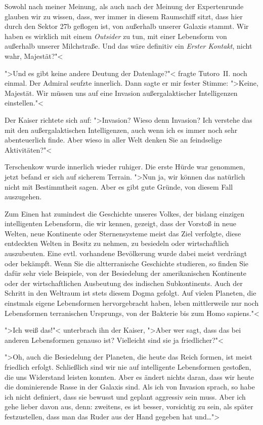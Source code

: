 Sowohl nach meiner Meinung, als auch nach der Meinung der Expertenrunde glauben wir zu wissen, dass, wer immer in diesem Raumschiff sitzt, dass hier durch den Sektor \textsf{27b} geflogen ist, von außerhalb unserer Galaxis stammt. Wir haben es wirklich mit einem \emph{Outsider} zu tun, mit einer Lebensform von außerhalb unserer Milchstraße. Und das wäre definitiv ein \emph{Erster Kontakt}, nicht wahr, Majestät?"<

">Und es gibt keine andere Deutung der Datenlage?"< fragte Tutoro~II. noch einmal. Der Admiral seufzte innerlich. Dann sagte er mir fester Stimme: ">Keine, Majestät. Wir müssen uns auf eine Invasion außergalaktischer Intelligenzen einstellen."<

Der Kaiser richtete sich auf: ">Invasion? Wieso denn Invasion? Ich verstehe das mit den außergalaktischen Intelligenzen, auch wenn ich es immer noch sehr abenteuerlich finde. Aber wieso in aller Welt denken Sie an feindselige Aktivitäten?"<

Terschenkow wurde innerlich wieder ruhiger. Die erste Hürde war genommen, jetzt befand er sich auf sicherem Terrain. ">Nun ja, wir können das natürlich nicht mit Bestimmtheit sagen. Aber es gibt gute Gründe, von diesem Fall auszugehen.

Zum Einen hat zumindest die Geschichte unseres Volkes, der bislang einzigen intelligenten Lebensform, die wir kennen, gezeigt, dass der Vorstoß in neue Welten, neue Kontinente oder Sternensysteme meist das Ziel verfolgte, diese entdeckten Welten in Besitz zu nehmen, zu besiedeln oder wirtschaftlich auszubeuten. Eine evtl. vorhandene Bevölkerung wurde dabei meist verdrängt oder bekämpft. Wenn Sie die altterranische Geschichte studieren, so finden Sie dafür sehr viele Beispiele, von der Besiedelung der amerikanischen Kontinente oder der wirtschaftlichen Ausbeutung des indischen Subkontinents. Auch der Schritt in den Weltraum ist stets diesem Dogma gefolgt. Auf vielen Planeten, die einstmals eigene Lebensformen hervorgebracht haben, leben mittlerweile nur noch Lebensformen terranischen Ursprungs, von der Bakterie bis zum Homo sapiens."<

">Ich weiß das!"< unterbrach ihn der Kaiser, ">Aber wer sagt, dass das bei anderen Lebensformen genauso ist? Vielleicht sind sie ja friedlicher?"<

">Oh, auch die Besiedelung der Planeten, die heute das Reich formen, ist meist friedlich erfolgt. Schließlich sind wir nie auf intelligente Lebensformen gestoßen, die uns Widerstand leisten konnten. Aber es ändert nichts daran, dass wir heute die dominierende Rasse in der Galaxis sind. Als ich von Invasion sprach, so habe ich nicht definiert, dass sie bewusst und geplant aggressiv sein muss. Aber ich gehe lieber davon aus, denn: zweitens, es ist besser, vorsichtig zu sein, als später festzustellen, dass man das Ruder aus der Hand gegeben hat und\dots">

